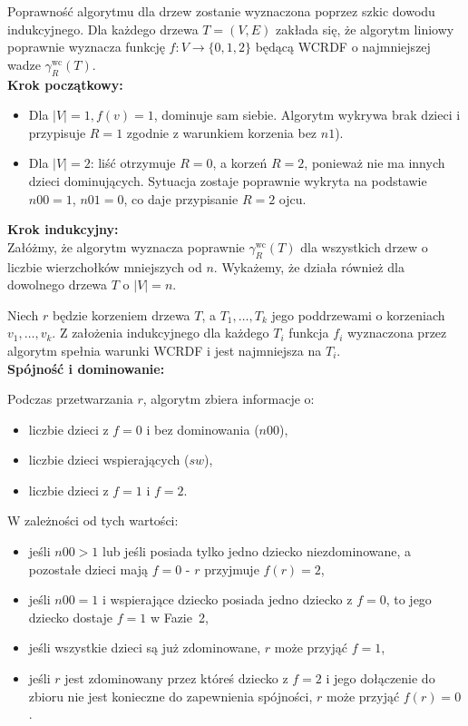 Poprawność algorytmu dla drzew zostanie wyznaczona poprzez szkic dowodu indukcyjnego. Dla każdego drzewa $T = (V, E)$ zakłada się, że algorytm liniowy poprawnie wyznacza funkcję $f : V \to \{0,1,2\}$ będącą WCRDF o najmniejszej wadze $\gamma_R^{\text{wc}}(T)$.\\
\textbf{Krok początkowy:}
\begin{itemize}
    \item Dla $|V| = 1, f(v)= 1 $, dominuje sam siebie. Algorytm wykrywa brak dzieci i przypisuje $R = 1$ zgodnie z warunkiem korzenia bez $n1$).
    \item Dla $|V| = 2$: liść otrzymuje $R = 0$, a korzeń $R = 2$, ponieważ nie ma innych dzieci dominujących. Sytuacja zostaje poprawnie wykryta na podstawie $n00 = 1$, $n01 = 0$, co daje przypisanie $R=2$ ojcu. 
\end{itemize}
\textbf{Krok indukcyjny:}\\ 
Załóżmy, że algorytm wyznacza poprawnie $\gamma_R^{\text{wc}}(T)$ dla wszystkich drzew o liczbie wierzchołków mniejszych od $n$. Wykażemy, że działa również dla dowolnego drzewa $T$ o $|V| = n$.

Niech $r$ będzie korzeniem drzewa $T$, a $T_1, \dots, T_k$ jego poddrzewami o korzeniach $v_1, \dots, v_k$. Z założenia indukcyjnego dla każdego $T_i$ funkcja $f_i$ wyznaczona przez algorytm spełnia warunki WCRDF i jest najmniejsza na $T_i$.\\
\textbf{Spójność i dominowanie:}

Podczas przetwarzania $r$, algorytm zbiera informacje o:
\begin{itemize}
\item liczbie dzieci z $f=0$ i bez dominowania ($n00$),
\item liczbie dzieci wspierających ($sw$),
\item liczbie dzieci z $f=1$ i $f=2$.
\end{itemize}

W zależności od tych wartości:
\begin{itemize}
\item jeśli $n00 > 1$ lub jeśli posiada tylko jedno dziecko niezdominowane, a pozostałe dzieci mają $f = 0$ - $r$ przyjmuje $f(r) = 2$,
\item jeśli $n00 = 1$ i wspierające dziecko posiada jedno dziecko z $f=0$, to jego dziecko dostaje $f=1$ w Fazie~2,
\item jeśli wszystkie dzieci są już zdominowane, $r$ może przyjąć $f = 1$,
\item jeśli $r$ jest zdominowany przez któreś dziecko z $f = 2$ i jego dołączenie do zbioru nie jest konieczne do zapewnienia spójności, $r$ może przyjąć $f(r) = 0$.
\end{itemize}

